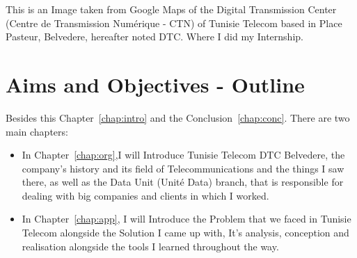 	This is an Image taken from Google Maps of the Digital Transmission Center (Centre de Transmission Numérique - CTN) of Tunisie Telecom based in Place Pasteur, Belvedere, hereafter noted DTC. Where I did my Internship.
\section{Aims and Objectives - Outline} 
	Besides this Chapter~\autoref{chap:intro} and the Conclusion~\autoref{chap:conc}. There are two main chapters:
	\begin{itemize}
	\item In Chapter~\autoref{chap:org},I will Introduce Tunisie Telecom DTC Belvedere, the company's history and its field of Telecommunications and the things I saw there, as well as the Data Unit (Unité Data) branch, that is responsible for dealing with big companies and clients in which I worked.
	\item In Chapter~\autoref{chap:app}, I will Introduce the Problem that we faced in Tunisie Telecom alongside the Solution I came up with, It's analysis, conception and realisation alongside the tools I learned throughout the way.
	\end{itemize}
